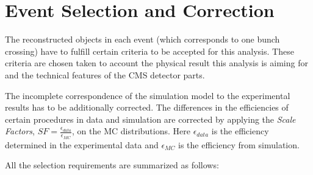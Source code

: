 % 
% 
% 
% 

\section{Event Selection and Correction}

The reconstructed objects in each event (which corresponds to one bunch crossing) have to fulfill certain criteria to be accepted for this analysis. These 
criteria are chosen taken to account the physical result this analysis is aiming for and the technical features of the CMS detector parts.

The incomplete correspondence of the simulation model to the experimental results has to be additionally corrected. The differences in the efficiencies 
of certain procedures in data and simulation are corrected by applying the \textit{Scale Factors}, $SF = \frac{\epsilon_{data}}{\epsilon_{MC}}$, 
on the MC distributions. Here $\epsilon_{data}$ is the efficiency determined in the experimental data and $\epsilon_{MC}$ is the efficiency from
simulation. 

All the selection requirements are summarized as follows:

